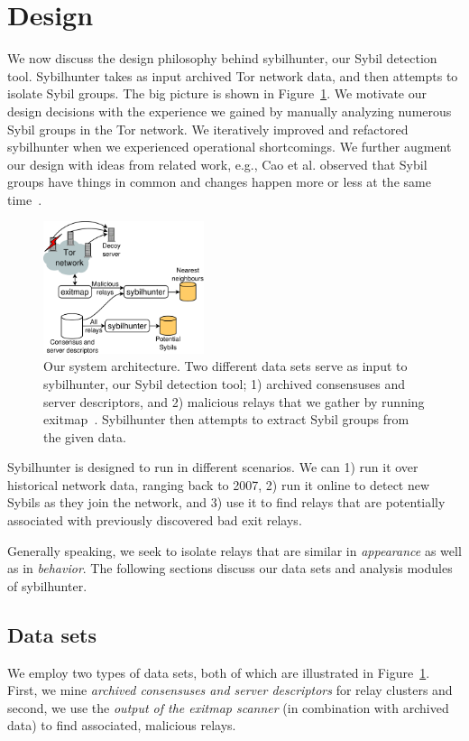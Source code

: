 \section{Design}
\label{sec:design}
We now discuss the design philosophy behind sybilhunter, our Sybil detection
tool.  Sybilhunter takes as input archived Tor network data, and then attempts
to isolate Sybil groups.  The big picture is shown in Figure~\ref{fig:system}.
We motivate our design decisions with the experience we gained by manually
analyzing numerous Sybil groups in the Tor network.  We iteratively improved
and refactored sybilhunter when we experienced operational shortcomings.  We
further augment our design with ideas from related work, e.g., Cao et al.
observed that Sybil groups have things in common and changes happen more or
less at the same time~\cite{Cao2014a}.

\begin{figure}[t]
	\centering
	\includegraphics[width=0.42\textwidth]{diagrams/system_architecture.pdf}
	\caption{Our system architecture.  Two different data sets serve as input
		to sybilhunter, our Sybil detection tool; 1) archived consensuses and
		server descriptors, and 2) malicious relays that we gather by running
		exitmap~\cite{Winter2014a}.  Sybilhunter then attempts to extract Sybil
		groups from the given data.}
	\label{fig:system}
\end{figure}

Sybilhunter is designed to run in different scenarios.  We can 1) run it over
historical network data, ranging back to 2007, 2) run it online to detect new
Sybils as they join the network, and 3) use it to find relays that are
potentially associated with previously discovered bad exit relays.

Generally speaking, we seek to isolate relays that are similar in
\emph{appearance} as well as in \emph{behavior}.  The following sections
discuss our data sets and analysis modules of sybilhunter.

\subsection{Data sets}
We employ two types of data sets, both of which are illustrated in
Figure~\ref{fig:system}.  First, we mine \emph{archived consensuses and server
descriptors} for relay clusters and second, we use the \emph{output of the
exitmap scanner} (in combination with archived data) to find associated,
malicious relays.

